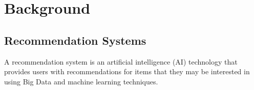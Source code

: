 \chapter{Background}
\minitoc









\section{Recommendation Systems}\label{sec:recommendation-systems}
A recommendation system is an artificial intelligence (AI) technology that provides users with recommendations for items that they may be interested in using Big Data and machine learning techniques. 

